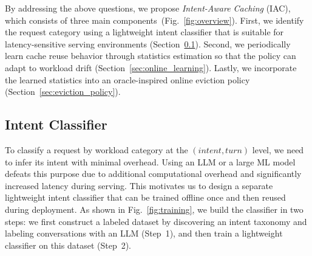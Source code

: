 \documentclass{article}
\newcommand{\jiny}[1]{\textcolor{orange}{[Jiny: #1]}}
\newcommand{\bo}[1]{\textcolor{red}{[Bo: #1]}}
\begin{document}
By addressing the above questions, we propose \textit{Intent-Aware Caching} (IAC), which consists of three main components~(Fig.~\ref{fig:overview}). First, we identify the request category using a lightweight intent classifier that is suitable for latency-sensitive serving environments (Section~\ref{sec:intent_classifier}). Second, we periodically learn cache reuse behavior through statistics estimation so that the policy can adapt to workload drift (Section~\ref{sec:online_learning}). Lastly, we incorporate the learned statistics into an oracle-inspired online eviction policy (Section~\ref{sec:eviction_policy}).


\subsection{Intent Classifier}
\label{sec:intent_classifier}

To classify a request by workload category at the \((\textit{intent}, \textit{turn})\) level, we need to infer its intent with minimal overhead. Using an LLM or a large ML model defeats this purpose due to additional computational overhead and significantly increased latency during serving. This motivates us to design a separate lightweight intent classifier that can be trained offline once and then reused during deployment. As shown in Fig.~\ref{fig:training}, we build the classifier in two steps: we first construct a labeled dataset by discovering an intent taxonomy and labeling conversations with an LLM (Step~1), and then train a lightweight classifier on this dataset (Step~2).

\end{document}
